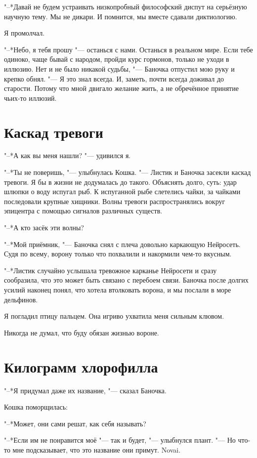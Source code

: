 \documentclass[a4paper,10pt]{book}
\begin{document}
"--*Давай не будем устраивать низкопробный философский диспут на серьёзную 
научную тему.
Мы не дикари. И помнится, мы вместе сдавали диктиологию.

Я промолчал.

"--*Небо, я тебя прошу "--- останься с нами. Останься в реальном мире. Если 
тебе одиноко,
чаще бывай с народом, пройди курс гормонов, только не уходи в иллюзию.
Нет и не было никакой судьбы, "--- Баночка отпустил мою руку и крепко обнял.
"--- Я это знал всегда. И, заметь, почти всегда доживал до старости. Потому что 
мной двигало
желание жить, а не обречённое принятие чьих-то иллюзий.

\section{Каскад тревоги}

"--*А как вы меня нашли? "--- удивился я.

"--*Ты не поверишь, "--- улыбнулась Кошка. "--- Листик и Баночка засекли каскад 
тревоги. Я бы в жизни не додумалась до такого. Объяснять долго, суть: удар 
шлюпки о воду испугал рыб. К испуганной рыбе слетелись чайки, за чайками 
последовали крупные хищники. Волны тревоги распространялись вокруг эпицентра с 
помощью сигналов различных существ.

"--*А кто засёк эти волны?

"--*Мой приёмник, "--- Баночка снял с плеча довольно каркающую Нейросеть. Судя 
по всему, ворону только что похвалили и накормили чем-то вкусным.

"--*Листик случайно услышала тревожное карканье Нейросети и сразу сообразила, 
что это может быть связано с перебоем связи. Баночка после долгих усилий 
наконец понял, что хотела втолковать ворона, и мы послали в море дельфинов.

Я погладил птицу пальцем. Она игриво ухватила меня сильным клювом.

Никогда не думал, что буду обязан жизнью вороне.

\section{Килограмм хлорофилла}

"--*Я придумал даже их название, "--- сказал Баночка.

Кошка поморщилась:

"--*Может, они сами решат, как себя называть?

"--*Если им не понравится моё "--- так и будет, "--- улыбнулся плант. "--- Но 
что-то мне подсказывает, что это название они примут. Novai.
\end{document}

